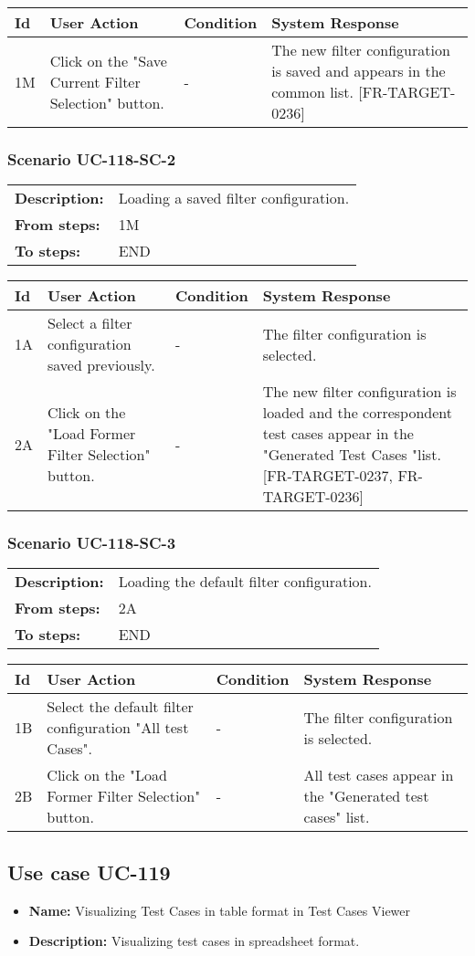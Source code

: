 \documentclass[a4paper,11pt]{article}
\newcommand{\bl}{\\ \hline}
\begin{document}
\begin{tabular}{|p{0.8in}|p{1.6in}|p{1.6in}|p{1.6in}|}
\hline
Id & User Action & Condition & System Response  \bl 
1M & Click on the "Save Current Filter Selection" button. & - & The new filter configuration is saved and appears in the common list. [FR-TARGET-0236] \bl 
\end{tabular}
\subsubsection*{Scenario UC-118-SC-2}
\begin{tabular}{p{1in}p{4in}}
{\bf Description:} & Loading a saved filter configuration. \\
{\bf From steps:} & 1M \\
{\bf To steps:} & END \\
\end{tabular}
 
\begin{tabular}{|p{0.8in}|p{1.6in}|p{1.6in}|p{1.6in}|}
\hline
Id & User Action & Condition & System Response  \bl 
1A & Select a filter configuration saved previously. & - & The filter configuration is selected. \bl 
2A & Click on the "Load Former Filter Selection" button. & - & The new filter configuration is loaded and the correspondent test cases appear in the "Generated Test Cases "list. [FR-TARGET-0237, FR-TARGET-0236] \bl 
\end{tabular}
\subsubsection*{Scenario UC-118-SC-3}
\begin{tabular}{p{1in}p{4in}}
{\bf Description:} & Loading the default filter configuration. \\
{\bf From steps:} & 2A \\
{\bf To steps:} & END \\
\end{tabular}
 
\begin{tabular}{|p{0.8in}|p{1.6in}|p{1.6in}|p{1.6in}|}
\hline
Id & User Action & Condition & System Response  \bl 
1B & Select the default filter configuration "All test Cases". & - & The filter configuration is selected. \bl 
2B & Click on the "Load Former Filter Selection" button. & - & All test cases appear in the "Generated test cases" list. \bl 
\end{tabular}
\subsection*{Use case UC-119}
\begin{itemize}
\item {\bf Name: }Visualizing Test Cases in table format in Test Cases Viewer
\item {\bf Description: }Visualizing test cases in spreadsheet format.
\end{itemize}
\end{document}
